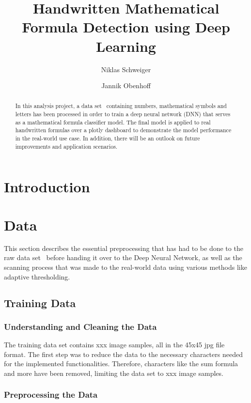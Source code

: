 \documentclass[@CLASSOPTIONS@]{tumarticle}
\title{Handwritten Mathematical Formula Detection using Deep Learning}
\author[affil={1}, email={niklas.schweiger@tum.de}]{Niklas Schweiger}
\author[affil={1}, email={jannik.obenhoff@tum.de}]{Jannik Obenhoff}
\affil{Department of Electrical and Computer Engineering, Technical
  University of Munich, Arcisstr. 21, 80333 Munich, Germany}
\begin{document}
\twocolumn

\maketitle
\begin{abstract}
  In this analysis project, a data set~\cite{kaggledataset} containing numbers, mathematical
  symbols and letters has been processed in order to train a deep neural network (DNN) that
  serves as a mathematical formula classifier model.
  The final model is applied to real handwritten formulas over a plotly dashboard to demonstrate the model
  performance in the real-world use case.
  In addition, there will be an outlook on future improvements and application scenarios.

\end{abstract}

\section{Introduction}

\section{Data}
\label{sec:measures}

This section describes the essential preprocessing that has had to be done to the raw
data set~\cite{kaggledataset} before handing it over to the Deep Neural Network,
as well as the scanning process that was made to the real-world data using
various methods like adaptive thresholding.

\subsection{Training Data}
\subsubsection{Understanding and Cleaning the Data}

The training data set contains xxx image samples, all in the 45x45 jpg file format.
The first step was to reduce the data to the necessary characters needed for the
implemented functionalities.
Therefore, characters like the sum formula and more have been removed, limiting the data set
to xxx image samples.

\subsubsection{Preprocessing the Data}
\end{document}
